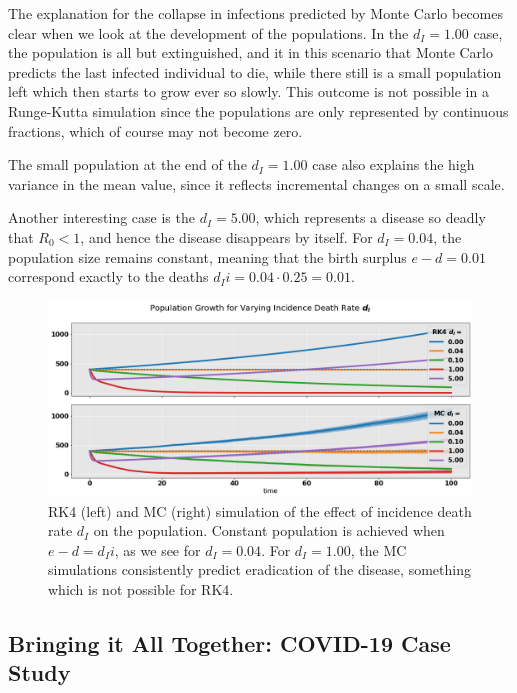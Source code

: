 \documentclass[]{article}
\begin{document}
The explanation for the collapse in infections predicted by Monte Carlo becomes clear when we look at the development of the populations. In the $d_I=1.00$ case, the population is all but extinguished, and  it in this scenario that Monte Carlo predicts the last infected individual to die, while there still is a small population left which then starts to grow ever so slowly. This outcome is not possible in a Runge-Kutta simulation since the populations are only represented by continuous fractions, which of course may not become zero.

The small population at the end of the $d_I=1.00$ case also explains the high variance in the mean value, since it reflects incremental changes on a small scale.

Another interesting case is the $d_I=5.00$, which represents a disease so deadly that $R_0 < 1$, and hence the disease disappears by itself. For $d_I=0.04$, the population size remains constant, meaning that the birth surplus $e-d = 0.01$ correspond exactly to the deaths $d_Ii = 0.04 \cdot 0.25 = 0.01$.


\begin{figure}[!h]
	\centering
	\includegraphics[width=1\linewidth]{./figs/dynamic-pop-pop-growth.png}
	\caption{RK4 (left) and MC (right) simulation of the effect of incidence death rate $d_I$ on the population. Constant population is achieved when $e-d=d_Ii$, as we see for $d_I=0.04$. For $d_I=1.00$, the MC simulations consistently predict eradication of the disease, something which is not possible for RK4.}
	\label{fig:dynamic-pop-pop-growth}
\end{figure}



\subsection{Bringing it All Together: COVID-19 Case Study} \label{sec:case-study}
\end{document}
